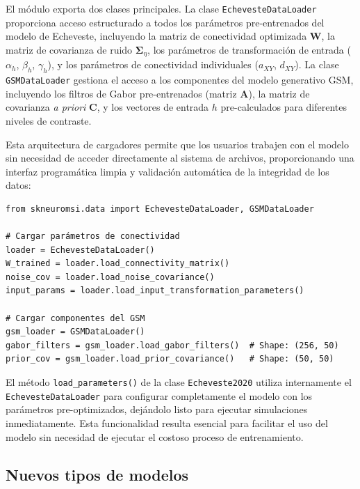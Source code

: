 El módulo exporta dos clases principales. La clase \texttt{EchevesteDataLoader} proporciona acceso estructurado a todos los parámetros pre-entrenados del modelo de Echeveste, incluyendo la matriz de conectividad optimizada $\mathbf{W}$, la matriz de covarianza de ruido $\boldsymbol{\Sigma}_\eta$, los parámetros de transformación de entrada ($\alpha_h$, $\beta_h$, $\gamma_h$), y los parámetros de conectividad individuales ($a_{XY}$, $d_{XY}$). La clase \texttt{GSMDataLoader} gestiona el acceso a los componentes del modelo generativo \acrshort{GSM}, incluyendo los filtros de Gabor pre-entrenados (matriz $\mathbf{A}$), la matriz de covarianza \textit{a priori} $\mathbf{C}$, y los vectores de entrada $h$ pre-calculados para diferentes niveles de contraste.

Esta arquitectura de cargadores permite que los usuarios trabajen con el modelo sin necesidad de acceder directamente al sistema de archivos, proporcionando una interfaz programática limpia y validación automática de la integridad de los datos:

\begin{code}
\begin{verbatim}
from skneuromsi.data import EchevesteDataLoader, GSMDataLoader

# Cargar parámetros de conectividad
loader = EchevesteDataLoader()
W_trained = loader.load_connectivity_matrix()
noise_cov = loader.load_noise_covariance()
input_params = loader.load_input_transformation_parameters()

# Cargar componentes del GSM
gsm_loader = GSMDataLoader()
gabor_filters = gsm_loader.load_gabor_filters()  # Shape: (256, 50)
prior_cov = gsm_loader.load_prior_covariance()   # Shape: (50, 50)
\end{verbatim}
\caption{Uso de los cargadores de datos implementados.}
\label{code:data_loaders}
\end{code}
\vspace{1.5em}

El método \texttt{load\_parameters()} de la clase \texttt{Echeveste2020} utiliza internamente el \texttt{Echeveste\allowbreak DataLoader} para configurar completamente el modelo con los parámetros pre-optimizados, dejándolo listo para ejecutar simulaciones inmediatamente. Esta funcionalidad resulta esencial para facilitar el uso del modelo sin necesidad de ejecutar el costoso proceso de entrenamiento.

\subsection{Nuevos tipos de modelos}
\label{subsec:impl_modulo_generative}

